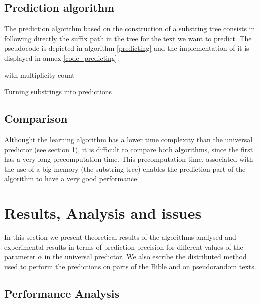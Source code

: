 \documentclass[a4paper,12pt]{article}
\begin{document}
  \subsection{Prediction algorithm}

  The prediction algorithm based on the construction of a substring tree consists in following directly the suffix path in the tree for the text we want to predict. The pseudocode is depicted in algorithm \ref{predicting} and the implementation of it is displayed in annex \ref{code_predicting}.

  \begin{algorithm}

     with multiplicity count\;

    \caption{\label{predicting}Turning substrings into predictions}
  \end{algorithm}

  \subsection{Comparison}

  Althought the learning algorithm has a lower time complexity than the universal predictor (see section \ref{tests}), it is difficult to compare both algorithms, since the first has a very long precomputation time. This precomputation time, associated with the use of a big memory (the substring tree) enables the prediction part of the algorithm to have a very good performance.

  \section{Results, Analysis and issues}\label{tests}

  In this section we present theoretical results of the algorithms analysed and experimental results in terms of prediction precision for different values of the parameter $\alpha$ in the universal predictor. We also escribe the distributed method used to perform the predictions on parts of the Bible and on pseudorandom texts.

  \subsection{Performance Analysis}
\end{document}
